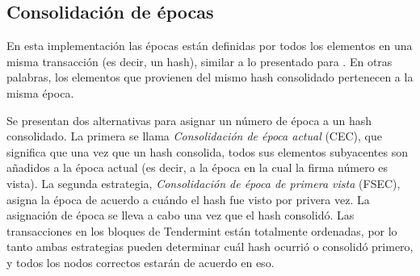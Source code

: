 
\subsection{Consolidación de épocas}\label{subsubsec:consolidation}

En esta implementación las épocas están definidas por todos los elementos en una misma transacción
(es decir, un hash), similar
a lo presentado para \compresschain.
%
En otras palabras, los elementos que provienen del mismo hash consolidado pertenecen a la
misma época.

%
%

%

Se presentan dos alternativas para asignar un número de época a un hash consolidado.
%
La primera se llama \textit{Consolidación de época actual} (CEC), que significa que 
una vez que un hash consolida, todos sus elementos subyacentes son añadidos a la época actual
(es decir, a la época en la cual la firma número \SPH es vista).
%
La segunda estrategia, \textit{Consolidación de época de primera vista} (FSEC), asigna la época
de acuerdo a cuándo el hash fue visto por privera vez. La asignación de época se lleva
a cabo una vez que el hash consolidó. 
%
Las transacciones
en los bloques de Tendermint están totalmente ordenadas,
por lo tanto ambas estrategias pueden determinar cuál hash ocurrió o consolidó primero, y
todos los nodos correctos estarán de acuerdo en eso.

